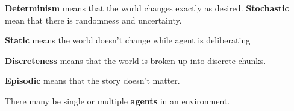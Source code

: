 \begin{definition}
	\textbf{Determinism} means that the world changes exactly as desired. \textbf{Stochastic} mean that there is randomness and uncertainty.
\end{definition}

\begin{definition}
	\textbf{Static} means the world doesn't change while agent is deliberating
\end{definition}

\begin{definition}
	\textbf{Discreteness} means that the world is broken up into discrete chunks.
\end{definition}

\begin{definition}
	\textbf{Episodic} means that the story doesn't matter.
\end{definition}

\begin{definition}
	There many be single or multiple \textbf{agents} in an environment.
\end{definition}
